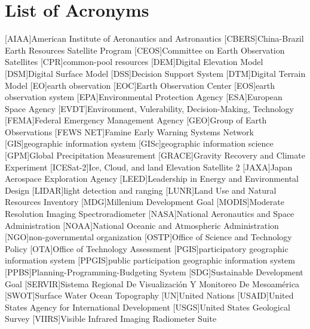 \tableofcontents
\newpage
\listoffigures
\newpage
\listoftables
\newpage
\chapter*{List of Acronyms}

\begin{acronym}[HyperLEAVES] \itemsep0pt \setlength{\parskip}{0pt}
[AIAA]{American Institute of Aeronautics and Astronautics}
[CBERS]{China-Brazil Earth Resources Satellite Program}
[CEOS]{Committee on Earth Observation Satellites}
[CPR]{common-pool resources}
[DEM]{Digital Elevation Model}
[DSM]{Digital Surface Model}
[DSS]{Decision Support System}
[DTM]{Digital Terrain Model}
[EO]{earth observation}
[EOC]{Earth Observation Center}
[EOS]{earth observation system}
[EPA]{Environmental Protection Agency}
[ESA]{European Space Agency}
[EVDT]{Environment, Vulerability, Decision-Making, Technology}
[FEMA]{Federal Emergency Management Agency}
[GEO]{Group of Earth Observations}
[FEWS NET]{Famine Early Warning Systems Network}
[GIS]{geographic information system}
[GISc]{geographic information science}
[GPM]{Global Precipitation Measurement}
[GRACE]{Gravity Recovery and Climate Experiment}
[ICESat-2]{Ice, Cloud, and land Elevation Satellite 2}
[JAXA]{Japan Aerospace Exploration Agency}
[LEED]{Leadership in Energy and Environmental Design}
[LIDAR]{light detection and ranging}
[LUNR]{Land Use and Natural Resources Inventory}
[MDG]{Millenium Development Goal}
[MODIS]{Moderate Resolution Imaging Spectroradiometer}
[NASA]{National Aeronautics and Space Administration}
[NOAA]{National Oceanic and Atmospheric Administration}
[NGO]{non-governmental organization}
[OSTP]{Office of Science and Technology Policy}
[OTA]{Office of Technology Assessment}
[PGIS]{participatory geographic information system}
[PPGIS]{public participation geographic information system}
[PPBS]{Planning-Programming-Budgeting System}
[SDG]{Sustainable Development Goal}
[SERVIR]{Sistema Regional De Visualizaci\'{o}n Y Monitoreo De Mesoam\'{e}rica}
[SWOT]{Surface Water Ocean Topography}
[UN]{United Nations}
[USAID]{United States Agency for International Development}
[USGS]{United States Geological Survey}
[VIIRS]{Visible Infrared Imaging Radiometer Suite}


\end{acronym}
